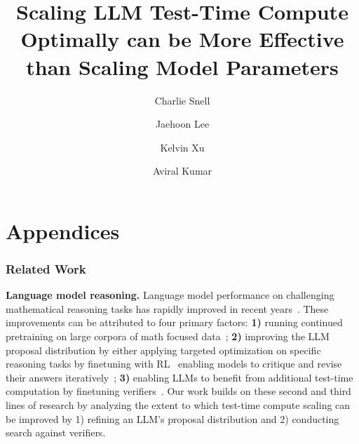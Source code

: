 \documentclass[11pt, letterpaper, logo]{googledeepmind}
\title{Scaling LLM Test-Time Compute Optimally can be More Effective than Scaling Model Parameters}
\author[$\vardiamondsuit$, 1]{Charlie Snell}
\author[2]{Jaehoon Lee}
\author[$\clubsuit$, 2]{Kelvin Xu}
\author[$\clubsuit$, 2]{Aviral Kumar}
\affil[$\clubsuit$]{Equal advising}
\affil[1]{UC Berkeley}
\affil[2]{Google DeepMind}
\affil[$\vardiamondsuit$]{Work done during an internship at Google DeepMind}
\begin{document}
\maketitle




\nobibliography*


\newpage 

\appendix 
\part*{Appendices}

\vspace{-0.2cm}
\section{Related Work}
\vspace{-0.2cm}

\textbf{Language model reasoning.} Language model performance on challenging mathematical reasoning tasks has rapidly improved in recent years~\citep{lewkowycz2022solving,geminiteam2024gemini,openai2024gpt4,shao2024deepseekmath,lightman2023lets}.
These improvements can be attributed to four primary factors: \textbf{1)} running continued pretraining on large corpora of math focused data~\citep{lewkowycz2022solving,geminiteam2024gemini,shao2024deepseekmath,lightman2023lets}; \textbf{2)} improving the LLM proposal distribution by either applying targeted optimization on specific reasoning tasks by finetuning with RL~\citep{singh2024human,zelikman2022star,shao2024deepseekmath,yuan2023scaling} enabling models to critique and revise their answers iteratively~\citep{bai2022constitutional,madaan2023selfrefine,du2023improving,saunders2022selfcritiquing}; \textbf{3)} enabling LLMs to benefit from additional test-time computation by finetuning verifiers~\citep{lightman2023lets,cobbe2021training,uesato2022solving,wang2023mathshepherd,yao2023tree,feng2024alphazerolike,chen2024alphamath,tian2024selfimprovement}.
Our work builds on these second and third lines of research by analyzing the extent to which test-time compute scaling can be improved by 1) refining an LLM's proposal distribution and 2) conducting search against verifiers.
\end{document}

